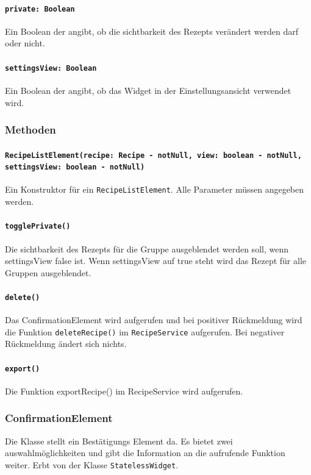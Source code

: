 \documentclass{entwurfsheft}
\begin{document}
            \paragraph*{\texttt{private: Boolean}} Ein Boolean der angibt, ob die \Gls{sichtbarkeit} des Rezepts verändert werden darf oder nicht.
            \paragraph*{\texttt{settingsView: Boolean}} Ein Boolean der angibt, ob das Widget in der Einstellungsansicht verwendet wird.

        \subsubsection*{Methoden}
            \paragraph*{\texttt{RecipeListElement(recipe: Recipe - notNull, view: boolean - notNull, settingsView: boolean - notNull)}} Ein Konstruktor für ein  \texttt{RecipeListElement}. Alle Parameter müssen angegeben werden.
            \paragraph*{\texttt{togglePrivate()}} Die \Gls{sichtbarkeit} des Rezepts für die Gruppe ausgeblendet werden soll, wenn settingsView false ist. Wenn settingsView auf true steht wird das Rezept für alle Gruppen ausgeblendet.
            \paragraph*{\texttt{delete()}} Das ConfirmationElement wird aufgerufen und bei positiver Rückmeldung wird die Funktion \texttt{deleteRecipe()} im \texttt{RecipeService} aufgerufen. Bei negativer Rückmeldung ändert sich nichts.
            \paragraph*{\texttt{export()}} Die Funktion exportRecipe() im RecipeService wird aufgerufen.

    \subsubsection{ConfirmationElement} \label{sec:ConfirmationElement}
        Die Klasse stellt ein Bestätigungs Element da. Es bietet zwei auswahlmöglichkeiten und gibt die Information an die aufrufende Funktion weiter. Erbt von der Klasse \texttt{StatelessWidget}.
\end{document}
